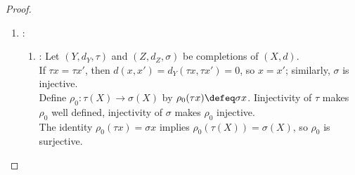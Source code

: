\begin{theorem}
\begin{proof}
\begin{enumerate}[label=(\roman*)]
\begin{enumerate}[label=(\alph*)]
\item {}: Fix $[a]\in\widehat{X}$ and $\varepsilon>0$. Choose $N_0\in\N$ with $(\forall m,n\geq N_0)\,d(a_m,a_n)<\frac{\varepsilon}{2}$.\\
For $N\geq N_0$, $\widehat{d}(\iota(a_N),[a])\leq\frac{\varepsilon}{2}<\varepsilon$ by Proposition \ref{prop:convergent-sequence-basic-consequences}(iii). Hence $\iota(a_N)\to[a]$, and $\overline{\iota(X)}^{\,\widehat{X}}=\widehat{X}$ by Proposition \ref{prop:sequential-closure-criterion}.
\item {}: Let $(\xi_k)$ be Cauchy in $\widehat{X}$. By (c), choose $x_k\in X$ with $\widehat{d}(\iota(x_k),\xi_k)<\frac{1}{k}$.\\
The bound $d(x_k,x_l)\leq\frac{1}{k}+\widehat{d}(\xi_k,\xi_l)+\frac{1}{l}$ follows by the triangle inequality.\\
Hence $(x_k)$ is Cauchy by Definition \ref{def:cauchy-sequence} and Theorem \ref{thm:special-sequence-limits}(i).\\
Set $a\defeq(x_k)\in\operatorname{CS}(X)$. Then $\widehat{d}(\xi_k,[a])<\frac{1}{k}+\lim\limits_{j\to\infty}d(x_k,x_j)$ by the triangle inequality.\\
Given $\varepsilon>0$, choose $K\in\N$ with $\frac{1}{K}<\frac{\varepsilon}{2}$ and $(\forall k,j\geq K)\,d(x_k,x_j)<\frac{\varepsilon}{2}$.\\
For $k\geq K$, the final limit is at most $\frac{\varepsilon}{2}$ by Proposition \ref{prop:convergent-sequence-basic-consequences}(iii). Hence $\widehat{d}(\xi_k,[a])<\varepsilon$.\\
Thus $\xi_k\to[a]$, and $(\widehat{X},\widehat{d},\iota)$ is a completion of $(X,d)$ by Definitions \ref{def:complete-metric-space} and \ref{def:metric-completion}.
\end{enumerate}
\item {}:
\begin{enumerate}[label=(\alph*)]
\setlength{\itemsep}{0pt}
\item {}: Let $(Y,d_Y,\tau)$ and $(Z,d_Z,\sigma)$ be completions of $(X,d)$.\\
If $\tau x=\tau x'$, then $d(x,x')=d_Y(\tau x,\tau x')=0$, so $x=x'$; similarly, $\sigma$ is injective.\\
Define $\rho_0:\tau(X)\to\sigma(X)$ by $\rho_0(\tau x)\defeq\sigma x$. Iinjectivity of $\tau$ makes $\rho_0$ well defined, injectivity of $\sigma$ makes $\rho_0$ injective.\\
The identity $\rho_0(\tau x)=\sigma x$ implies $\rho_0(\tau(X))=\sigma(X)$, so $\rho_0$ is surjective.\\

\end{enumerate}
\end{enumerate}
\end{proof}
\end{theorem}
